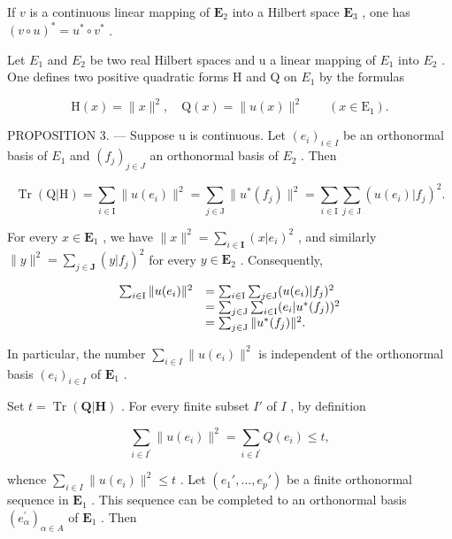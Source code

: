 If \(v\) is a continuous linear mapping of \(\mathbf{E}_2\) into a Hilbert space \(\mathbf{E}_3\) , one has \((v \circ u)^* = u^* \circ v^*\) .

Let \(E_{1}\) and \(E_{2}\) be two real Hilbert spaces and u a linear mapping of \(E_{1}\) into \(E_{2}\) . One defines two positive quadratic forms H and Q on \(E_{1}\) by the formulas

\[
\mathrm{H} (x) = \| x \| ^ {2}, \quad \mathrm{Q} (x) = \| u (x) \| ^ {2} \qquad (x \in \mathrm{E} _ {1}).
\]

PROPOSITION 3. --- Suppose u is continuous. Let \((e_{i})_{i\in I}\) be an orthonormal basis of \(E_{1}\) and \((f_{j})_{j\in J}\) an orthonormal basis of \(E_{2}\) . Then

\[
\operatorname{Tr} (\mathrm{Q} | \mathrm{H}) = \sum_ {i \in \mathrm{I}} \| u (e _ {i}) \| ^ {2} = \sum_ {j \in \mathrm{J}} \| u ^ {*} (f _ {j}) \| ^ {2} = \sum_ {i \in \mathrm{I}} \sum_ {j \in \mathrm{J}} (u (e _ {i}) | f _ {j}) ^ {2}.
\]

For every \(x \in \mathbf{E}_1\) , we have \(\|x\|^2 = \sum_{i \in \mathbf{I}} (x|e_i)^2\) , and similarly \(\|y\|^2 = \sum_{j \in \mathbf{J}} (y|f_j)^2\) for every \(y \in \mathbf{E}_2\) . Consequently,

\[
\begin{array}{r l} \sum_ {i \in \mathrm{I}} \| u (e _ {i}) \| ^ {2} & = \sum_ {i \in \mathrm{I}} \sum_ {j \in \mathrm{J}} (u (e _ {i}) | f _ {j}) ^ {2} \\ & = \sum_ {j \in \mathrm{J}} \sum_ {i \in \mathrm{I}} (e _ {i} | u ^ {*} (f _ {j})) ^ {2} \\ & = \sum_ {j \in \mathrm{J}} \| u ^ {*} (f _ {j}) \| ^ {2}. \end{array}
\]

In particular, the number \(\sum_{i\in I}\| u(e_i)\|^2\) is independent of the orthonormal basis \((e_i)_{i\in I}\) of \(\mathbf{E}_1\) .

Set \(t = \operatorname{Tr}(\mathbf{Q}|\mathbf{H})\) . For every finite subset \(I'\) of \(I\) , by definition

\[
\sum_ {i \in I ^ {\prime}} \| u (e _ {i}) \| ^ {2} = \sum_ {i \in I ^ {\prime}} Q (e _ {i}) \leqslant t,
\]

whence \(\sum_{i\in I}\| u(e_i)\|^2\leqslant t\) . Let \((e_1',\dots ,e_p')\) be a finite orthonormal sequence in \(\mathbf{E}_1\) . This sequence can be completed to an orthonormal basis \((e_{\alpha}^{\prime})_{\alpha \in A}\) of \(\mathbf{E}_1\) . Then

